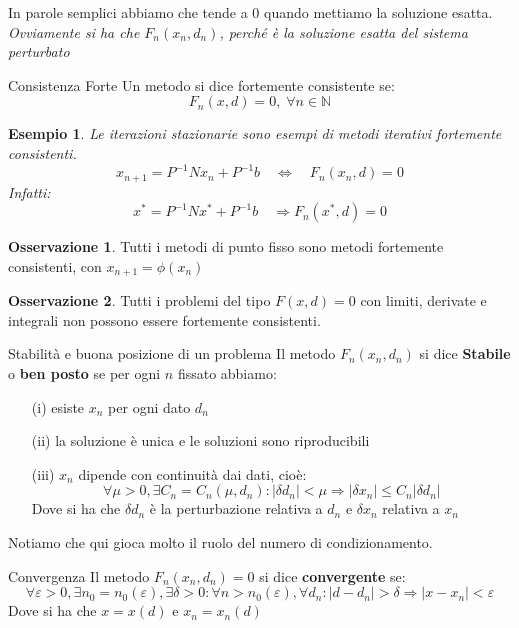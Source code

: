 \documentclass[11pt,a4paper,twoside]{article}
\newcommand{\vareps}{\varepsilon}
\newtheorem{es}{Esempio}
\theoremstyle{definition}
\newtheorem*{oss}{Osservazione}
\begin{document}
In parole semplici abbiamo che tende a $0$ quando mettiamo la soluzione esatta. \textit{Ovviamente si ha che $F_n(x_n, d_n)$, perché è la soluzione esatta del sistema perturbato}

\begin{defn}{Consistenza Forte}{}
	Un metodo si dice fortemente consistente se:
	\[ F_n(x, d) = 0, \; \forall n \in \mathbb N \]
\end{defn}

\begin{es}
	Le iterazioni stazionarie sono esempi di metodi iterativi fortemente consistenti.
	\[ x_{n+1} = P^{-1}Nx_n + P^{-1}b \quad \Leftrightarrow \quad F_n(x_n, d) = 0\]
	Infatti:
	\[ x^* = P^{-1}Nx^* + P^{-1}b \quad \Rightarrow F_n(x^*, d)=0 \]
\end{es}

\begin{oss}
	Tutti i metodi di punto fisso sono metodi fortemente consistenti, con $x_{n+1} = \phi (x_n)$
\end{oss}

\begin{oss}
	Tutti i problemi del tipo $F(x, d) = 0$ con limiti, derivate e integrali non possono essere fortemente consistenti.
\end{oss}

\begin{defn}{Stabilità e buona posizione di un problema}{}
	Il metodo $F_n(x_n, d_n)$ si dice \textbf{Stabile} o \textbf{ben posto} se per ogni $n$ fissato abbiamo:
	\begin{itemize}
		\item[(i)] esiste $x_n$ per ogni dato $d_n$
		\item[(ii)] la soluzione è unica e le soluzioni sono riproducibili
		\item[(iii)] $x_n$ dipende con continuità dai dati, cioè:
			\[\forall \mu > 0, \exists C_n = C_n(\mu, d_n): |\delta d_n| < \mu \Rightarrow |\delta x_n|\leq C_n|\delta d_n|\]
			Dove si ha che $\delta d_n$ è la perturbazione relativa a $d_n$ e $\delta x_n$ relativa a $x_n$
	\end{itemize}
\end{defn}

Notiamo che qui gioca molto il ruolo del numero di condizionamento.

\begin{defn}{Convergenza}{}
	Il metodo $F_n(x_n, d_n) = 0$ si dice \textbf{convergente} se:
	\[\forall \vareps > 0, \exists n_0 = n_0(\vareps), \exists \delta >0 : \forall n > n_0(\vareps), \forall d_n : |d-d_n|>\delta \Rightarrow |x-x_n|<\vareps\]
	Dove si ha che $x = x(d)$ e $x_n = x_n(d)$
\end{defn}
\end{document}
